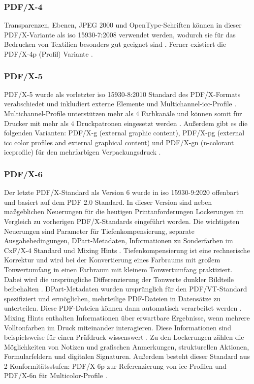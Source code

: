 \subsubsection{PDF/X-4}
Transparenzen, Ebenen, JPEG 2000 und OpenType-Schriften können in dieser PDF/X-Variante als \gls{iso} 15930-7:2008 \cite{proj-consult, schneeberger} verwendet werden, wodurch sie für das Bedrucken von Textilien besonders gut geeignet sind \cite{adobe-pdf-x}. Ferner existiert die PDF/X-4p (Profil) Variante \cite{schneeberger}. 

\subsubsection{PDF/X-5}
PDF/X-5 wurde als vorletzter \gls{iso} 15930-8:2010 Standard des PDF/X-Formats verabschiedet und inkludiert externe Elemente und Multichannel-\gls{icc}-Profile \cite{proj-consult}. Multichannel-Profile unterstützen mehr als 4 Farbkanäle und können somit für Drucker mit mehr als 4 Druckpatronen eingesetzt werden \cite{adobe-profil}. Außerdem gibt es die folgenden Varianten: PDF/X-g (external graphic content), PDF/X-pg (external \gls{icc} color profiles and external graphical content) und PDF/X-gn (n-colorant \gls{icc}profile) für den mehrfarbigen Verpackungsdruck \cite{schneeberger}.

\subsubsection{PDF/X-6}
Der letzte PDF/X-Standard als Version 6 wurde in \gls{iso} 15930-9:2020 offenbart und basiert auf dem PDF 2.0 Standard. In dieser Version sind neben maßgeblichen Neuerungen für die heutigen Printanforderungen Lockerungen im Vergleich zu vorherigen PDF/X-Standards eingeführt worden. Die wichtigsten Neuerungen sind Parameter für Tiefenkompensierung, separate Ausgabebedingungen, DPart-Metadaten, Informationen zu Sonderfarben im CxF/X-4 Standard und Mixing Hints \cite{proj-consult}. Tiefenkompensierung ist eine rechnerische Korrektur und wird bei der Konvertierung eines Farbraums mit großem Tonwertumfang in einen Farbraum mit kleinem Tonwertumfang praktiziert. Dabei wird die ursprüngliche Differenzierung der Tonwerte dunkler Bildteile beibehalten \cite{tiefen}. DPart-Metadaten wurden ursprünglich für den PDF/VT-Standard spezifiziert und ermöglichen, mehrteilige PDF-Dateien in Datensätze zu unterteilen. Diese PDF-Dateien können dann automatisch verarbeitet werden \cite{pdfa-dpart}. Mixing Hints enthalten Informationen über erwartbare Ergebnisse, wenn mehrere Volltonfarben im Druck miteinander interagieren. Diese Informationen sind beispielsweise für einen Prüfdruck wissenswert \cite{mixing-hints}. Zu den Lockerungen zählen die Möglichkeiten von Notizen und grafischen Anmerkungen, strukturellen Aktionen, Formularfeldern und digitalen Signaturen. Außerdem besteht dieser Standard aus 2 Konformitätsstufen: PDF/X-6p zur Referenzierung von \gls{icc}-Profilen und PDF/X-6n für Multicolor-Profile \cite{proj-consult}. 

